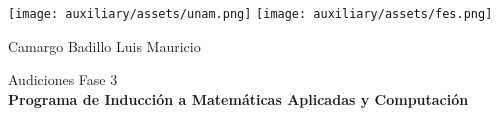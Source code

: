 \begin{titlepage}
    \begin{center}
        \texttt{[image: auxiliary/assets/unam.png]}
        \hspace{0.6\textwidth}
        \texttt{[image: auxiliary/assets/fes.png]}

        \vspace*{5cm}
        \LARGE
        \textbf{\titulo}

        \vspace{1cm}
        \large
        Camargo Badillo Luis Mauricio \\
        \vspace{1.5cm}

        \vfill

        \vspace{0.5cm}
        Audiciones Fase 3 \\
        \textbf{Programa de Inducción a Matemáticas Aplicadas y Computación}\\
    \end{center}
\end{titlepage}
